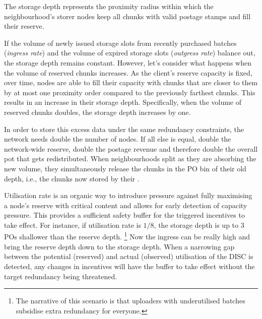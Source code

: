 The storage depth represents the proximity radius within which the neighbourhood's storer nodes keep all chunks with valid postage stamps and fill their reserve. 


If the volume of newly issued storage slots from recently purchased batches (\emph{ingress rate}\/) and the volume of expired storage slots (\emph{outgress rate}\/) balance out, the storage depth remains constant.
However, let's consider what happens when the volume of reserved chunks increases.
As the client's reserve capacity is fixed, over time, nodes are able to fill their capacity with chunks that are closer to them by at most one proximity order compared to the previously farthest chunks. This results in an increase in their storage depth.
Specifically, when the volume of reserved chunks doubles,  the storage depth increases by one.  

In order to store this excess data under the same redundancy constraints, the network needs double the number of nodes. If all else is equal, double the network-wide reserve, double the postage revenue and therefore double the overall pot that gets redistributed. When neighbourhoods split as they are absorbing the new volume, they simultaneously release the chunks in the PO bin of their old depth, i.e., the chunks now stored by their . 

Utilisation rate is an organic way to introduce pressure against fully maximising a node's reserve with critical content and allows for early detection of capacity pressure. This provides a sufficient safety buffer for the triggered incentives to take effect. For instance, if utilisation rate is $1/8$, the storage depth is up to 3 POs shallower than the reserve depth.%
%
\footnote{The narrative of this scenario is that uploaders with underutilised batches subsidise extra redundancy for everyone.}
%
Now the ingress can be really high and bring the reserve depth down to the storage depth. When a narrowing gap between the potential (reserved) and actual (observed) utilisation of the DISC is detected, any changes in incentives will have the buffer to take effect without the target redundancy being threatened. 






